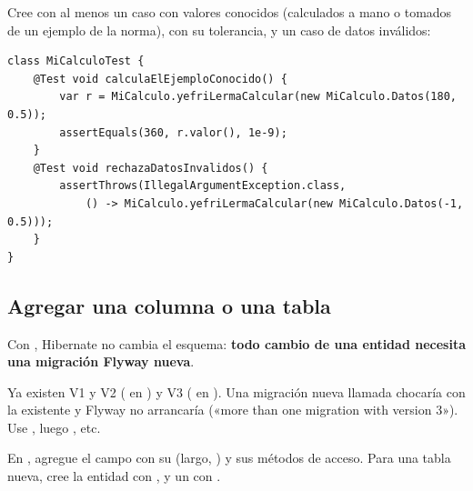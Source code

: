 \par\medskip\noindent{}\hspace{0.5em}{\bfseries Escribir las pruebas}\par\nopagebreak\smallskip

Cree  con al menos un caso con valores conocidos (calculados a
mano o tomados de un ejemplo de la norma), con su tolerancia, y un caso de datos inválidos:

\begin{verbatim}
class MiCalculoTest {
    @Test void calculaElEjemploConocido() {
        var r = MiCalculo.yefriLermaCalcular(new MiCalculo.Datos(180, 0.5));
        assertEquals(360, r.valor(), 1e-9);
    }
    @Test void rechazaDatosInvalidos() {
        assertThrows(IllegalArgumentException.class,
            () -> MiCalculo.yefriLermaCalcular(new MiCalculo.Datos(-1, 0.5)));
    }
}
\end{verbatim}

\subsection{Agregar una columna o una tabla}
\label{sec:amp-esquema}

Con , Hibernate no cambia el esquema: \textbf{todo cambio de una entidad necesita una migración
Flyway nueva}.

\begin{advertencia}
Ya existen V1 y V2 ( en ) y V3 ( en
). Una migración nueva llamada  chocaría con la existente y Flyway
no arrancaría («more than one migration with version 3»). Use , luego , etc.
\end{advertencia}

\par\medskip\noindent{}\hspace{0.5em}{\bfseries Cambiar la entidad}\par\nopagebreak\smallskip

En , agregue el campo con su  (largo, ) y sus métodos de acceso. Para una
tabla nueva, cree la entidad con ,  y un   con
.

